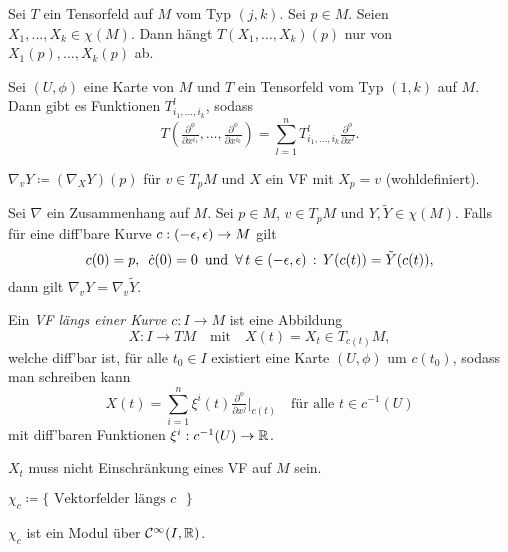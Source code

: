 \documentclass{cheat-sheet}
\newcommand{\coord}[1]{\tfrac{\partial^\phi}{\partial x^{#1}}} %
\newcommand{\vinterval}{\ointerval{-\epsilon}{\epsilon}} %
\newcommand{\Cont}{\mathcal{C}} %
\begin{document}
\begin{satz}
  Sei $T$ ein Tensorfeld auf $M$ vom Typ $(j, k)$. Sei $p \in M$. Seien $X_1, \ldots, X_k \in \chi(M)$. Dann hängt $T(X_1, \ldots, X_k)(p)$ nur von $X_1(p), \ldots, X_k(p)$ ab.
\end{satz}


\begin{bem}
  Sei $(U, \phi)$ eine Karte von $M$ und $T$ ein Tensorfeld vom Typ $(1, k)$ auf $M$. Dann gibt es Funktionen $T_{i_1, \ldots, i_k}^l$, sodass
  \[ T(\coord{i_1}, \ldots, \coord{i_k}) = \sum_{l=1}^n T_{i_1, \ldots, i_k}^l \coord{l}. \]
\end{bem}

\begin{nota}
  $\nabla_v Y \coloneqq (\nabla_X Y)(p)$ für $v \in T_p M$ und $X$ ein VF mit $X_p = v$ (wohldefiniert).
\end{nota}

\begin{satz}
  Sei $\nabla$ ein Zusammenhang auf $M$. Sei $p \in M$, $v \in T_p M$ und $Y, \tilde{Y} \in \chi(M)$. Falls für eine diff'bare Kurve $c : \left( -\epsilon, \epsilon \right) \to M$ gilt
  \[
    c(0) = p, \enspace
    \dot{c}(0) = 0 \enspace \text{und} \enspace
    \fa{t \in \vinterval} Y(c(t)) = \tilde{Y}(c(t)),
  \]
  dann gilt $\nabla_v Y = \nabla_v \tilde{Y}$.
\end{satz}


\begin{defn}
  Ein \emph{VF längs einer Kurve} $c : I \to M$ ist eine Abbildung
  \[
    X : I \to TM
    \quad \text{mit} \quad
    X(t) = X_t \in T_{c(t)} M,
  \]
  welche diff'bar ist, \dh{} für alle $t_0 \in I$ existiert eine Karte $(U, \phi)$ um $c(t_0)$, sodass man schreiben kann
  \[
    X(t) = \sum_{i=1}^n \xi^i(t) \coord{j}|_{c(t)} \quad \text{für alle } t \in c^{-1}(U)
  \]
  mit diff'baren Funktionen $\xi^i : c^{-1}(U) \to \mathbb{R}$.
\end{defn}

\begin{bem}
  $X_t$ muss nicht Einschränkung eines VF auf $M$ sein.
\end{bem}

\begin{nota}
  $\chi_c \coloneqq \{ \text{ Vektorfelder längs $c$ } \}$
\end{nota}

\begin{bem}
  $\chi_c$ ist ein Modul über $\Cont^\infty(I, \R)$.
\end{bem}
\end{document}
